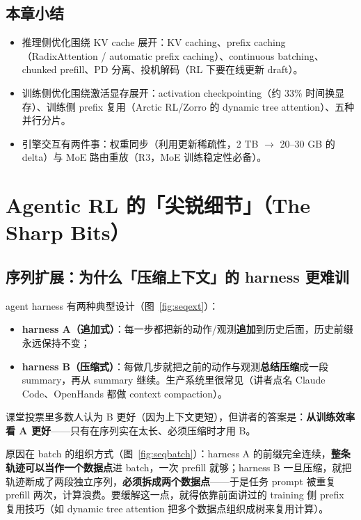 \documentclass[a4paper]{article}
\begin{document}
\subsection{本章小结}

\begin{itemize}
\item 推理侧优化围绕 KV cache 展开：KV caching、prefix caching（RadixAttention / automatic prefix caching）、continuous batching、chunked prefill、PD 分离、投机解码（RL 下要在线更新 draft）。
\item 训练侧优化围绕激活显存展开：activation checkpointing（约 33\% 时间换显存）、训练侧 prefix 复用（Arctic RL/Zorro 的 dynamic tree attention）、五种并行分片。
\item 引擎交互有两件事：权重同步（利用更新稀疏性，2 TB $\rightarrow$ 20--30 GB 的 delta）与 MoE 路由重放（R3，MoE 训练稳定性必备）。
\end{itemize}

\section{Agentic RL 的「尖锐细节」（The Sharp Bits）}

\subsection{序列扩展：为什么「压缩上下文」的 harness 更难训}

agent harness 有两种典型设计（图~\ref{fig:seqext}）：

\begin{itemize}
\item \textbf{harness A（追加式）}：每一步都把新的动作/观测\textbf{追加}到历史后面，历史前缀永远保持不变；
\item \textbf{harness B（压缩式）}：每做几步就把之前的动作与观测\textbf{总结压缩}成一段 summary，再从 summary 继续。生产系统里很常见（讲者点名 Claude Code、OpenHands 都做 context compaction）。
\end{itemize}

课堂投票里多数人认为 B 更好（因为上下文更短），但讲者的答案是：\textbf{从训练效率看 A 更好}——只有在序列实在太长、必须压缩时才用 B。

原因在 batch 的组织方式（图~\ref{fig:seqbatch}）：harness A 的前缀完全连续，\textbf{整条轨迹可以当作一个数据点}进 batch，一次 prefill 就够；harness B 一旦压缩，就把轨迹断成了两段独立序列，\textbf{必须拆成两个数据点}——于是任务 prompt 被重复 prefill 两次，计算浪费。要缓解这一点，就得依靠前面讲过的 training 侧 prefix 复用技巧（如 dynamic tree attention 把多个数据点组织成树来复用计算）。
\end{document}
